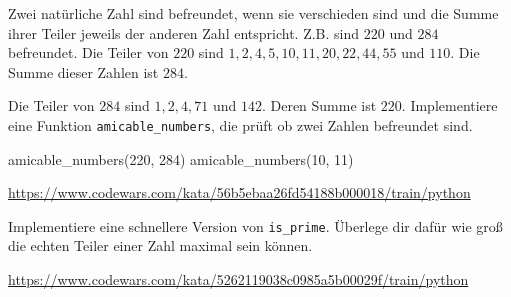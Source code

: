\documentclass[class=scrartcl, crop=false]{standalone}
\begin{document}
\begin{aufgabe} \noindent
Zwei natürliche Zahl sind befreundet, wenn sie verschieden sind und die Summe ihrer Teiler jeweils der anderen Zahl entspricht.
Z.B. sind $220$ und $284$ befreundet.  Die Teiler von $220$ sind $ 1, 2, 4, 5, 10, 11, 20, 22, 44, 55$ und $110$. Die Summe dieser Zahlen ist  $284$. 

Die Teiler von $284$ sind $ 1, 2, 4, 71  $ und $142$. Deren Summe ist $220$.
Implementiere eine Funktion \texttt{amicable_numbers}, die prüft ob zwei Zahlen befreundet sind.

\begin{pyconsole}
amicable_numbers(220, 284)
amicable_numbers(10, 11)
\end{pyconsole}

\noindent\url{https://www.codewars.com/kata/56b5ebaa26fd54188b000018/train/python}

\end{aufgabe}




\begin{aufgabe} \noindent
Implementiere eine schnellere Version von \texttt{is_prime}. Überlege dir dafür wie groß die echten Teiler einer Zahl maximal sein können.

\noindent\url{https://www.codewars.com/kata/5262119038c0985a5b00029f/train/python}
\end{aufgabe}
\end{document}

